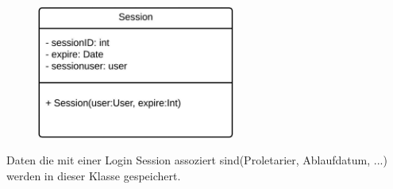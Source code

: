 \begin{itemize}
                \begin{figure}[htb]
                \centering
                \includegraphics[width=6.5cm]{Diagramms/class/singleclass/Session.pdf}
                \end{figure}
                \newline
                Daten die mit einer Login Session assoziert sind(Proletarier, Ablaufdatum, ...) werden in dieser Klasse gespeichert.
                \begin{itemize}
                \end{itemize}


        \end{itemize}

